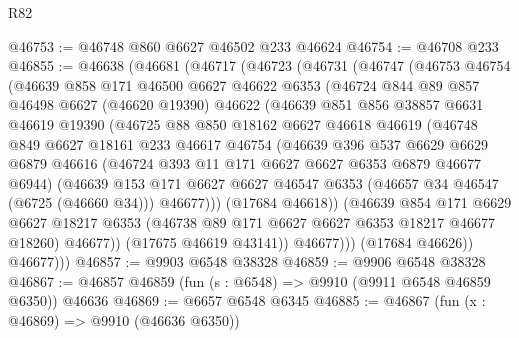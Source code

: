 \begin{lexlean}{R82}
\begin{coremodule}
@46753 := @46748 @860 @6627 @46502 @233 @46624
@46754 := @46708 @233
@46855 := @46638
    (@46681
      (@46717
        (@46723
          (@46731
            (@46747
              (@46753
                @46754
                (@46639
                  @858
                  @171
                  @46500
                  @6627
                  @46622
                  @6353
                  (@46724
                    @844
                    @89
                    @857
                    @46498
                    @6627
                    (@46620 @19390)
                    @46622
                    (@46639
                      @851
                      @856
                      @38857
                      @6631
                      @46619
                      @19390
                      (@46725
                        @88
                        @850
                        @18162
                        @6627
                        @46618
                        @46619
                        (@46748
                          @849
                          @6627
                          @18161
                          @233
                          @46617
                          @46754
                          (@46639
                            @396
                            @537
                            @6629
                            @6629
                            @6879
                            @46616
                            (@46724 @393 @11 @171 @6627 @6627 @6353 @6879 @46677 @6944)
                            (@46639
                              @153
                              @171
                              @6627
                              @6627
                              @46547
                              @6353
                              (@46657 @34 @46547 (@6725 (@46660 @34)))
                              @46677)))
                        (@17684 @46618))
                      (@46639
                        @854
                        @171
                        @6629
                        @6627
                        @18217
                        @6353
                        (@46738 @89 @171 @6627 @6627 @6353 @18217 @46677 @18260)
                        @46677))
                    (@17675 @46619 @43141))
                  @46677)))
            (@17684 @46626))
          @46677)))
@46857 := @9903 @6548 @38328
@46859 := @9906 @6548 @38328
@46867 := @46857 @46859 (fun (s : @6548) => @9910 (@9911 @6548 @46859 @6350)) @46636
@46869 := @6657 @6548 @6345
@46885 := @46867
    (fun (x : @46869) => @9910 (@46636 @6350))

\end{coremodule}
\end{lexlean}

